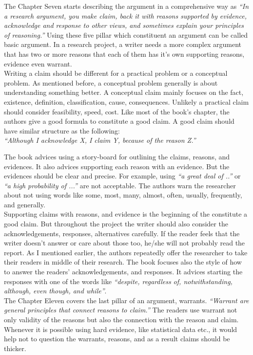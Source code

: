 \documentclass[11pt]{article} %
\begin{document}
The Chapter Seven starts describing the argument in a comprehensive way as \textit{“In a research argument, you make claim, back it with reasons supported by evidence, acknowledge and response to other views, and sometimes explain your principles of reasoning.”} Using these five pillar which constituent an argument can be called basic argument. In a research project, a writer needs a more complex argument that has two or more reasons that each of them has it's own supporting reasons, evidence even warrant.\\

Writing a claim should be different for a practical problem or a conceptual problem. As mentioned before, a conceptual problem generally is about understanding something better. A conceptual claim mainly focuses on the fact, existence, definition, classification, cause, consequences. Unlikely a practical claim should consider feasibility, speed, cost. Like most of the book's chapter, the authors give a good formula to constitute a good claim. A good claim should have similar structure as the following:\\
 \center \textit{“Although I acknowledge X, I claim Y, because of the reason Z.”}
 
 \justifying The book advices using a story-board for outlining the claims, reasons, and evidences. It also advices supporting each reason with an evidence. But the evidences should be clear and precise. For example, using \textit{“a great deal of ..”} or \textit{“a high probability of ...”} are not acceptable. The authors warn the researcher about not using words like some, most, many, almost, often, usually, frequently, and generally. \\

Supporting claims with reasons, and evidence is the beginning of the constitute a good claim. But throughout the project the writer should also consider the acknowledgements, responses, alternatives carefully. If the reader feels that the writer doesn't answer or care about those too, he/she will not probably read the report. As I mentioned earlier, the authors repeatedly offer the researcher to take their readers in middle of their research.  The book focuses also the style of how to answer the readers' acknowledgements, and responses. It advices starting the responses with one of the words like \textit{“despite, regardless of, notwithstanding, although, even though, and while”}.\\

The Chapter Eleven covers the last pillar of an argument, warrants. \textit{“Warrant are general principles that connect reasons to claim.”} The readers use warrant not only validity of the reasons but also the connection with the reason and claim. Whenever it is possible using hard evidence, like statistical data etc., it would help not to question the warrants, reasons, and as a result claims should be thicker. \\
\end{document}
